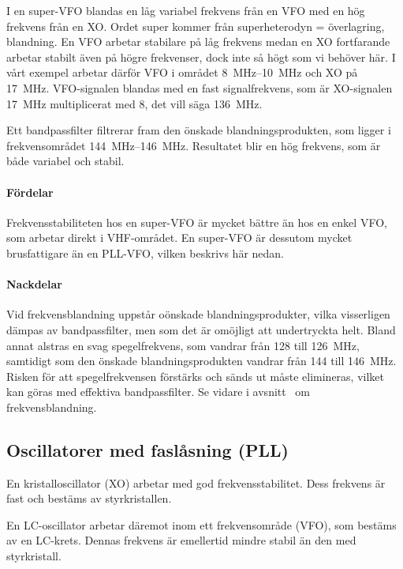 I en super-VFO blandas en låg variabel frekvens från en VFO med en hög
frekvens från en XO.
Ordet super kommer från superheterodyn = överlagring, blandning.
En VFO arbetar stabilare på låg frekvens medan en XO fortfarande arbetar
stabilt även på högre frekvenser, dock inte så högt som vi behöver här.
I vårt exempel arbetar därför VFO i området \SIrange{8}{10}{\mega\hertz} och XO
på \qty{17}{\mega\hertz}.
VFO-signalen blandas med en fast signalfrekvens, som är XO-signalen
\qty{17}{\mega\hertz} multiplicerat med 8, det vill säga \qty{136}{\mega\hertz}.

Ett bandpassfilter filtrerar fram den önskade blandningsprodukten, som
ligger i frekvensområdet \SIrange{144}{146}{\mega\hertz}.
Resultatet blir en hög frekvens, som är både variabel och stabil.

\paragraph{Fördelar}
Frekvensstabiliteten hos en super-VFO är mycket bättre än hos en enkel VFO,
som arbetar direkt i VHF-området.
En super-VFO är dessutom mycket brusfattigare än en PLL-VFO, vilken
beskrivs här nedan.

\paragraph{Nackdelar}
Vid frekvensblandning uppstår oönskade blandningsprodukter, vilka visserligen
dämpas av bandpassfilter, men som det är omöjligt att undertryckta helt.
Bland annat alstras en svag spegelfrekvens, som vandrar från 128 till
\qty{126}{\mega\hertz}, samtidigt som den önskade blandningsprodukten vandrar
från 144 till \qty{146}{\mega\hertz}.
Risken för att spegelfrekvensen förstärks och sänds ut måste elimineras, vilket
kan göras med effektiva bandpassfilter.
Se vidare i avsnitt~ om frekvensblandning.


\subsection{Oscillatorer med faslåsning (PLL)}
\label{PLL}

En kristalloscillator (XO) arbetar med god frekvensstabilitet.
Dess frekvens är fast och bestäms av styrkristallen.

En LC-oscillator arbetar däremot inom ett frekvensområde (VFO), som bestäms av
en LC-krets.
Dennas frekvens är emellertid mindre stabil än den med styrkristall.


